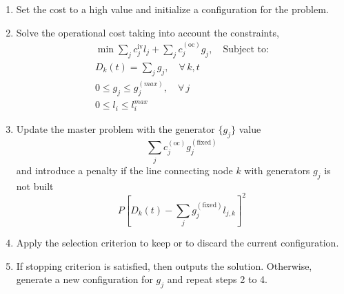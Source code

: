\begin{enumerate}
    \item Set the cost to a high value and initialize a configuration for the problem.
    \item Solve the operational cost taking into account the constraints,
    \begin{align}
        \min  \sum_{j}c^{\text{iv}}_{j}l_{j} + \sum_{j}c_{j}^{(\text{oc})}g_{j} ,\quad \text{Subject to:}\\
        D_{k}(t) = \sum_{j}g_{j}, \quad \forall\, k,t \\
        0\leq g_{j} \leq g_{j}^{(max)}, \quad \forall\, j\\
        0 \leq l_{i} \leq l_{i}^{max}
    \end{align}
    \item Update the master problem with the generator $\{g_{j}\}$ value 
    \begin{equation}
        \sum_{j}c_{j}^{(\text{oc})}g_{j}^{(\text{fixed})}
    \end{equation}
    and introduce a penalty if the line connecting node $k$ with generators $g_{j}$ is not built
    \begin{equation}
        P\left[D_{k}(t) - \sum_{j}g_{j}^{(\text{fixed})}l_{j,k}\right]^{2}
    \end{equation}
    \item Apply the selection criterion to keep or to discard the current configuration.
    \item If stopping criterion is satisfied, then outputs the solution. Otherwise, generate a new configuration for $g_{j}$ and repeat steps 2 to 4.
\end{enumerate}